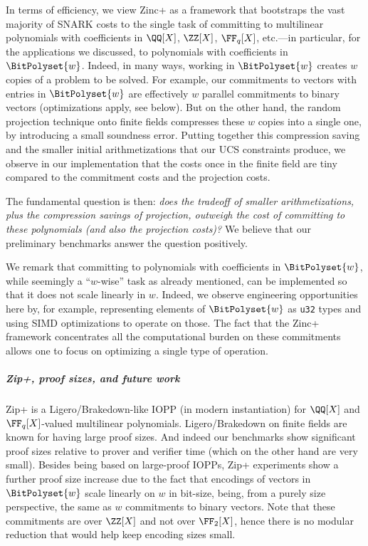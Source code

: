 In terms of efficiency, we view Zinc+ as a framework that bootstraps the vast majority of SNARK costs to the single task of committing to multilinear polynomials with coefficients in $\QQ[X]$, $\ZZ[X]$, $\FF_q[X]$, etc.---in particular, for the applications we discussed, to polynomials with coefficients in $\BitPolyset{w}$. Indeed, in many ways, working in $\BitPolyset{w}$ creates $w$ copies of a problem to be solved. For example, our commitments to vectors with entries in $\BitPolyset{w}$ are effectively $w$ parallel commitments to binary vectors (optimizations apply, see below).  But on the other hand, the random projection technique onto finite fields compresses these $w$ copies into a single one, by introducing a small soundness error. Putting together this compression saving and the smaller initial arithmetizations that our UCS constraints produce, we observe in our implementation that the costs once in the finite field are tiny compared to the commitment costs and the projection costs. 

The fundamental question is then: \emph{does the tradeoff of smaller arithmetizations, plus the compression savings of projection, outweigh the cost of committing to these polynomials (and also the projection costs)?} We believe that our preliminary benchmarks answer the question positively.

We remark that committing to polynomials with coefficients in $\BitPolyset{w}$, while seemingly a ``$w$-wise'' task as already mentioned, can be implemented so that it does not scale linearly in $w$. Indeed, we observe engineering opportunities here by, for example, representing elements of $\BitPolyset{w}$ as \texttt{u32} types and using SIMD optimizations to operate on those. The fact that the Zinc+ framework concentrates all the computational burden on these commitments allows one to focus on optimizing a single type of operation. 

\subparagraph{Zip+, proof sizes, and future work} Zip+ is a Ligero/Brakedown-like IOPP (in modern instantiation) for $\QQ[X]$ and $\FF_q[X]$-valued multilinear polynomials.  Ligero/Brakedown on finite fields are known for having large proof sizes. And indeed our benchmarks show significant proof sizes relative to prover and verifier time (which on the other hand are very small). Besides being based on large-proof IOPPs, Zip+ experiments show a further proof size increase due to the fact that encodings of vectors in $\BitPolyset{w}$ scale linearly on $w$ in bit-size, being, from a purely size perspective, the same as $w$ commitments to binary vectors. Note that these commitments are over $\ZZ[X]$ and not over $\FF_2[X]$, hence there is no modular reduction that would help keep encoding sizes small. 



